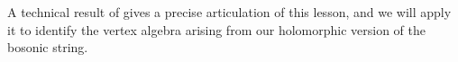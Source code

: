 A technical result of \cite{CG1} gives a precise articulation of this lesson,
and we will apply it to identify the vertex algebra arising from our holomorphic version of the bosonic string.
%
%
%
%
